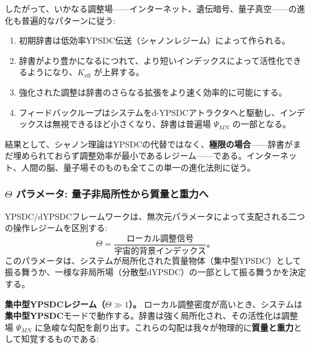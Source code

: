 \documentclass[12pt,a4paper]{article}
\theoremstyle{definition}
\theoremstyle{remark}
\begin{document}
	したがって、いかなる調整場——インターネット、遺伝暗号、量子真空——の進化も普遍的なパターンに従う:
	\begin{enumerate}[leftmargin=*]
		\item 初期辞書は低効率YPSDC伝送（シャノンレジーム）によって作られる。
		\item 辞書がより豊かになるにつれて、より短いインデックスによって活性化できるようになり、$K_{\mathrm{eff}}$ が上昇する。
		\item 強化された調整は辞書のさらなる拡張をより速く効率的に可能にする。
		\item フィードバックループはシステムをd-YPSDCアトラクタへと駆動し、インデックスは無視できるほど小さくなり、辞書は普遍場 $\Psi_{MN}$ の一部となる。
	\end{enumerate}
	
	結果として、シャノン理論はYPSDCの代替ではなく、\textbf{極限の場合}——辞書がまだ埋められておらず調整効率が最小であるレジーム——である。インターネット、人間の脳、量子場そのものも全てこの単一の進化法則に従う。
	
	\medskip
	
	\subsubsection{$\Theta$ パラメータ: 量子非局所性から質量と重力へ}
	\label{subsec:theta-mass-gravity}
	
	YPSDC/dYPSDCフレームワークは、無次元パラメータによって支配される二つの操作レジームを区別する:
	\begin{equation}
		\Theta = \frac{\text{ローカル調整信号}}{\text{宇宙的背景インデックス}}。
	\end{equation}
	このパラメータは、システムが局所化された質量物体（集中型YPSDC）として振る舞うか、一様な非局所場（分散型dYPSDC）の一部として振る舞うかを決定する。
	
	\textbf{集中型YPSDCレジーム（$\Theta \gg 1$）。}
	ローカル調整密度が高いとき、システムは\textbf{集中型YPSDC}モードで動作する。辞書は強く局所化され、その活性化は調整場 $\Psi_{MN}$ に急峻な勾配を創り出す。これらの勾配は我々が物理的に\textbf{質量と重力}として知覚するものである:
	
\end{document}
